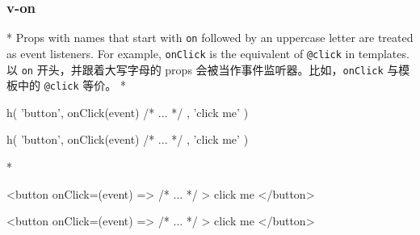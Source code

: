 \begin{paracol}{2}
\subsubsection{v-on}
\switchcolumn[0]*%
Props with names that start with \texttt{on} followed by an uppercase
letter are treated as event listeners. For example, \texttt{onClick} is
the equivalent of \texttt{@click} in templates.
\switchcolumn
以 \texttt{on} 开头，并跟着大写字母的 props
会被当作事件监听器。比如，\texttt{onClick} 与模板中的 \texttt{@click}
等价。
\switchcolumn[0]*%
\begin{codeJs}
h(
  'button',
  {
    onClick(event) {
      /* ... */
    }
  },
  'click me'
)
\end{codeJs}
\switchcolumn
\begin{codeJs}
h(
  'button',
  {
    onClick(event) {
      /* ... */
    }
  },
  'click me'
)
\end{codeJs}
\switchcolumn[0]*%
\begin{codeHtml}
<button
  onClick={(event) => {
    /* ... */
  }}
>
  click me
</button>
\end{codeHtml}
\switchcolumn
\begin{codeHtml}
<button
  onClick={(event) => {
    /* ... */
  }}
>
  click me
</button>
\end{codeHtml}
\end{paracol}




